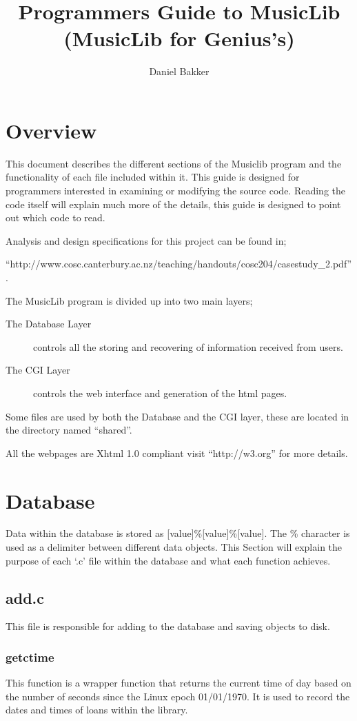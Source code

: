 \documentclass{article}
\title{Programmers Guide to MusicLib (MusicLib for Genius's)}
\author{Daniel Bakker}
\begin{document}
\maketitle
\tableofcontents
\newpage
\section{Overview}
This document describes the different sections of the Musiclib program and the functionality of each file included within it. This guide is designed for programmers interested in examining or modifying the source code. Reading the code itself will explain much more of the details, this guide is designed to point out which code to read.

Analysis and design specifications for this project can be found in;

 ``http://www.cosc.canterbury.ac.nz/teaching/handouts/cosc204/casestudy\_2.pdf''.

The MusicLib program is divided up into two main layers;
\begin{description} 
\item[The Database Layer] controls all the storing and recovering of information received from users.
\item[The CGI Layer] controls the web interface and generation of the html pages.
\end{description}

Some files are used by both the Database and the CGI layer, these are located in the directory named ``shared''.

All the webpages are Xhtml 1.0 compliant visit ``http://w3.org'' for more details.

\section{Database}
Data within the database is stored as [value]\%[value]\%[value]. The \% character is used as a delimiter between different data objects. This Section will explain the purpose of each `.c' file within the database and what each function achieves.
\subsection{add.c}
This file is responsible for adding to the database and saving objects to disk.

\subsubsection*{getctime}
 This function is a wrapper function that returns the current time of day based on the number of seconds since the Linux epoch 01/01/1970. It is used to record the dates and times of loans within the library.
\end{document}

